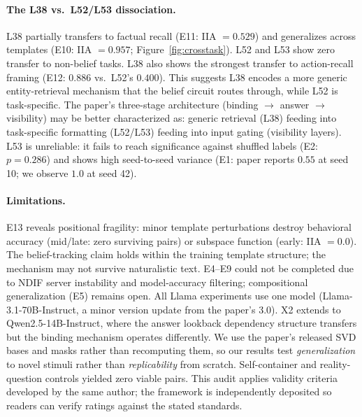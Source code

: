\documentclass{article}
\begin{document}
\paragraph{The L38 vs.\ L52/L53 dissociation.}
L38 partially transfers to factual recall (E11: IIA $= 0.529$) and generalizes across templates (E10: IIA $= 0.957$; Figure~\ref{fig:crosstask}). L52 and L53 show zero transfer to non-belief tasks. L38 also shows the strongest transfer to action-recall framing (E12: $0.886$ vs.\ L52's $0.400$). This suggests L38 encodes a more generic entity-retrieval mechanism that the belief circuit routes through, while L52 is task-specific. The paper's three-stage architecture (binding $\to$ answer $\to$ visibility) may be better characterized as: generic retrieval (L38) feeding into task-specific formatting (L52/L53) feeding into input gating (visibility layers). L53 is unreliable: it fails to reach significance against shuffled labels (E2: $p = 0.286$) and shows high seed-to-seed variance (E1: paper reports $0.55$ at seed 10; we observe $1.0$ at seed 42).

\paragraph{Limitations.}
E13 reveals positional fragility: minor template perturbations destroy behavioral accuracy (mid/late: zero surviving pairs) or subspace function (early: IIA $= 0.0$). The belief-tracking claim holds within the training template structure; the mechanism may not survive naturalistic text. E4--E9 could not be completed due to NDIF server instability and model-accuracy filtering; compositional generalization (E5) remains open. All Llama experiments use one model (Llama-3.1-70B-Instruct, a minor version update from the paper's 3.0). X2 extends to Qwen2.5-14B-Instruct, where the answer lookback dependency structure transfers but the binding mechanism operates differently. We use the paper's released SVD bases and masks rather than recomputing them, so our results test \emph{generalization} to novel stimuli rather than \emph{replicability} from scratch. Self-container and reality-question controls yielded zero viable pairs. This audit applies validity criteria developed by the same author; the framework is independently deposited so readers can verify ratings against the stated standards.
\end{document}
